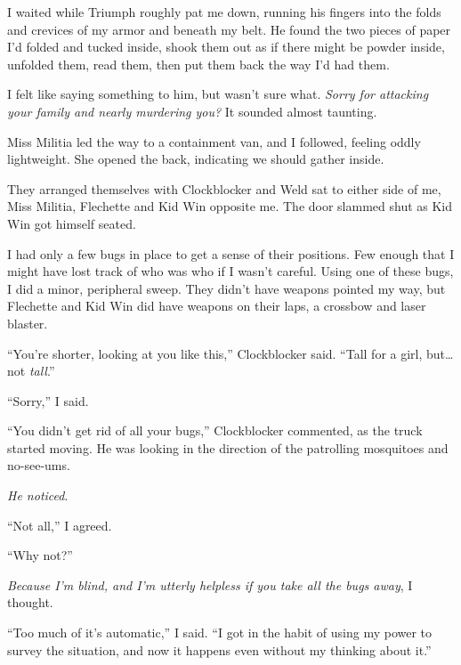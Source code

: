 I waited while Triumph roughly pat me down, running his fingers into the folds and crevices of my armor and beneath my belt.  He found the two pieces of paper I'd folded and tucked inside, shook them out as if there might be powder inside, unfolded them, read them, then put them back the way I'd had them.



I felt like saying something to him, but wasn't sure what.  \emph{Sorry for attacking your family and nearly murdering you?  }It sounded almost taunting.



Miss Militia led the way to a containment van, and I followed, feeling oddly lightweight.  She opened the back, indicating we should gather inside.



They arranged themselves with Clockblocker and Weld sat to either side of me, Miss Militia, Flechette and Kid Win opposite me.  The door slammed shut as Kid Win got himself seated.



I had only a few bugs in place to get a sense of their positions.  Few enough that I might have lost track of who was who if I wasn't careful.  Using one of these bugs, I did a minor, peripheral sweep.  They didn't have weapons pointed my way, but Flechette and Kid Win did have weapons on their laps, a crossbow and laser blaster.



``You're shorter, looking at you like this,'' Clockblocker said.  ``Tall for a girl, but\ldots not \emph{tall}.''



``Sorry,'' I said.



``You didn't get rid of all your bugs,'' Clockblocker commented, as the truck started moving.  He was looking in the direction of the patrolling mosquitoes and no-see-ums.



\emph{He noticed}.



``Not all,'' I agreed.



``Why not?''



\emph{Because I'm blind, and I'm utterly helpless if you take all the bugs away}, I thought.



``Too much of it's automatic,'' I said.  ``I got in the habit of using my power to survey the situation, and now it happens even without my thinking about it.''



